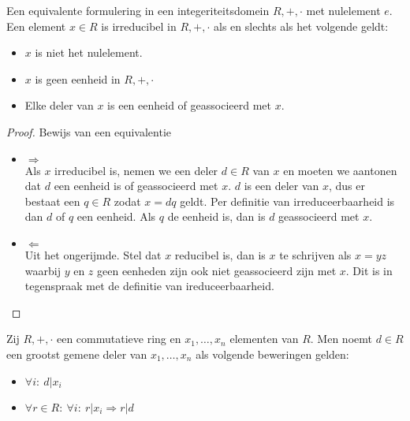 \documentclass[main.tex]{subfiles}
\begin{document}
\begin{ei}
  Een equivalente formulering in een integeriteitsdomein $R,+,\cdot$ met nulelement $e$.\\
  Een element $x\in R$ is irreducibel in $R,+,\cdot$ als en slechts als het volgende geldt:
  \begin{itemize}
  \item $x$ is niet het nulelement.
  \item $x$ is geen eenheid in $R,+,\cdot$
  \item Elke deler van $x$ is een eenheid of geassocieerd met $x$.
  \end{itemize}

  \begin{proof}
    Bewijs van een equivalentie\\
    \begin{itemize}
    \item $\Rightarrow$\\
      Als $x$ irreducibel is, nemen we een deler $d\in R$ van $x$ en moeten we aantonen dat $d$ een eenheid is of geassocieerd met $x$.
      $d$ is een deler van $x$, dus er bestaat een $q\in R$ zodat $x=dq$ geldt.
      Per definitie van irreduceerbaarheid is dan $d$ of $q$ een eenheid.
      Als $q$ de eenheid is, dan is $d$ geassocieerd met $x$.
    \item $\Leftarrow$\\
      Uit het ongerijmde.
      Stel dat $x$ reducibel is, dan is $x$ te schrijven als $x=yz$ waarbij $y$ en $z$ geen eenheden zijn ook niet geassocieerd zijn met $x$.
      Dit is in tegenspraak met de definitie van ireduceerbaarheid.
    \end{itemize}
  \end{proof}
\end{ei}


\begin{de}
  Zij $R,+,\cdot$ een commutatieve ring en $x_{1},\dotsc,x_{n}$ elementen van $R$.
  Men noemt $d\in R$ een grootst gemene deler van $x_{1},\dotsc,x_{n}$ als volgende beweringen gelden:
  \begin{itemize}
  \item $\forall i:\ d|x_{i}$
  \item $\forall r \in R:\ \forall i:\ r|x_{i} \Rightarrow r|d$
  \end{itemize}
\end{de}
\end{document}
